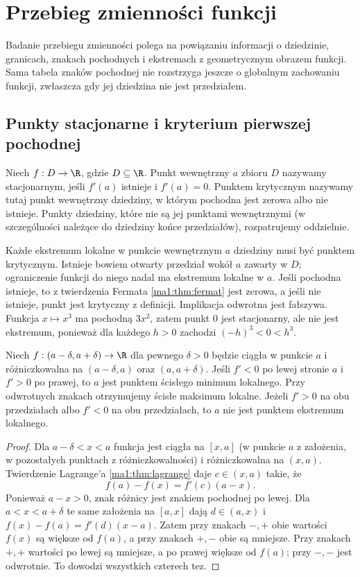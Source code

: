 \chapter{Przebieg zmienności funkcji}
\label{ma1:ch:function-variation}

Badanie przebiegu zmienności polega na powiązaniu informacji o dziedzinie, granicach, znakach pochodnych i ekstremach z geometrycznym obrazem funkcji. Sama tabela znaków pochodnej nie rozstrzyga jeszcze o globalnym zachowaniu funkcji, zwłaszcza gdy jej dziedzina nie jest przedziałem.

\section{Punkty stacjonarne i kryterium pierwszej pochodnej}
\begin{definicja}
\label{ma1:def:stationary-critical}
Niech $f:D\to\R$, gdzie $D\subseteq\R$. Punkt wewnętrzny $a$ zbioru $D$ nazywamy stacjonarnym, jeśli $f'(a)$ istnieje i $f'(a)=0$. Punktem krytycznym nazywamy tutaj punkt wewnętrzny dziedziny, w którym pochodna jest zerowa albo nie istnieje. Punkty dziedziny, które nie są jej punktami wewnętrznymi (w szczególności należące do dziedziny końce przedziałów), rozpatrujemy oddzielnie.
\end{definicja}
Każde ekstremum lokalne w punkcie wewnętrznym $a$ dziedziny musi być punktem krytycznym. Istnieje bowiem otwarty przedział wokół $a$ zawarty w $D$; ograniczenie funkcji do niego nadal ma ekstremum lokalne w $a$. Jeśli pochodna istnieje, to z twierdzenia Fermata \ref{ma1:thm:fermat} jest zerowa, a jeśli nie istnieje, punkt jest krytyczny z definicji. Implikacja odwrotna jest fałszywa. Funkcja $x\mapsto x^3$ ma pochodną $3x^2$, zatem punkt $0$ jest stacjonarny, ale nie jest ekstremum, ponieważ dla każdego $h>0$ zachodzi $(-h)^3<0<h^3$.

\begin{twierdzenie}
\label{ma1:thm:first-derivative-test}
Niech $f:(a-\delta,a+\delta)\to\R$ dla pewnego $\delta>0$ będzie ciągła w punkcie $a$ i różniczkowalna na $(a-\delta,a)$ oraz $(a,a+\delta)$. Jeśli $f'<0$ po lewej stronie $a$ i $f'>0$ po prawej, to $a$ jest punktem ścisłego minimum lokalnego. Przy odwrotnych znakach otrzymujemy ścisłe maksimum lokalne. Jeżeli $f'>0$ na obu przedziałach albo $f'<0$ na obu przedziałach, to $a$ nie jest punktem ekstremum lokalnego.
\end{twierdzenie}
\begin{proof}
Dla $a-\delta<x<a$ funkcja jest ciągła na $[x,a]$ (w punkcie $a$ z założenia, w pozostałych punktach z różniczkowalności) i różniczkowalna na $(x,a)$. Twierdzenie Lagrange'a \ref{ma1:thm:lagrange} daje $c\in(x,a)$ takie, że
\[
 f(a)-f(x)=f'(c)(a-x).
\]
Ponieważ $a-x>0$, znak różnicy jest znakiem pochodnej po lewej. Dla $a<x<a+\delta$ te same założenia na $[a,x]$ dają $d\in(a,x)$ i
$f(x)-f(a)=f'(d)(x-a)$. Zatem przy znakach $-,+$ obie wartości $f(x)$ są większe od $f(a)$, a przy znakach $+,-$ obie są mniejsze. Przy znakach $+,+$ wartości po lewej są mniejsze, a po prawej większe od $f(a)$; przy $-,-$ jest odwrotnie. To dowodzi wszystkich czterech tez.
\end{proof}

